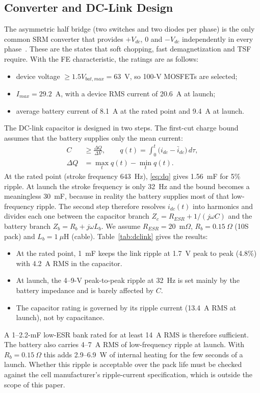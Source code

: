 \documentclass[journal]{IEEEtran}
\begin{document}
\subsection{Converter and DC-Link Design}
The asymmetric half bridge (two switches and two diodes per phase) is the only
common SRM converter that provides $+V_{dc}$, $0$ and $-V_{dc}$ independently in
every phase~\cite{krishnan2001,miller1993}. These are the states that soft
chopping, fast demagnetization and TSF require. With the FE characteristic,
the ratings are as follows:
\begin{itemize}
\item device voltage $\ge1.5V_{bat,max}=63$~V, so 100-V MOSFETs are selected;
\item $I_{max}=29.2$~A, with a device RMS current of 20.6~A at launch;
\item average battery current of 8.1~A at the rated point and 9.4~A at launch.
\end{itemize}

The DC-link capacitor is designed in two steps. The first-cut charge bound
assumes that the battery supplies only the mean current:
\begin{equation}
\begin{aligned}
C&\ge\frac{\Delta Q}{\Delta V},\qquad q(t)=\int_0^t\big(i_{dc}-\bar i_{dc}\big)\,d\tau,\\
\Delta Q&=\max_t q(t)-\min_t q(t).
\end{aligned}
\label{eq:dq}
\end{equation}
At the rated point (stroke frequency 643~Hz), \eqref{eq:dq} gives 1.56~mF for
5\% ripple. At launch the stroke frequency is only 32~Hz and the bound becomes a
meaningless 30~mF, because in reality the battery supplies most of that
low-frequency ripple. The second step therefore resolves $i_{dc}(t)$ into
harmonics and divides each one between the capacitor branch
$Z_c=R_{ESR}+1/(j\omega C)$ and the battery branch $Z_b=R_b+j\omega L_b$. We
assume $R_{ESR}=20$~m$\Omega$, $R_b=0.15~\Omega$ (10S pack) and $L_b=1~\mu$H
(cable). Table~\ref{tab:dclink} gives the results:
\begin{itemize}
\item At the rated point, 1~mF keeps the link ripple at 1.7~V peak to peak
(4.8\%) with 4.2~A RMS in the capacitor.
\item At launch, the 4--9-V peak-to-peak ripple at 32~Hz is set mainly by the
battery impedance and is barely affected by $C$.
\item The capacitor rating is governed by its ripple current (13.4~A RMS at
launch), not by capacitance.
\end{itemize}
A 1--2.2-mF low-ESR bank rated for at least 14~A RMS is therefore sufficient.
The battery also carries 4--7~A RMS of low-frequency ripple at launch. With
$R_b=0.15~\Omega$ this adds 2.9--6.9~W of internal heating for the few seconds
of a launch. Whether this ripple is acceptable over the pack life must be
checked against the cell manufacturer's ripple-current specification, which is
outside the scope of this paper.
\end{document}
